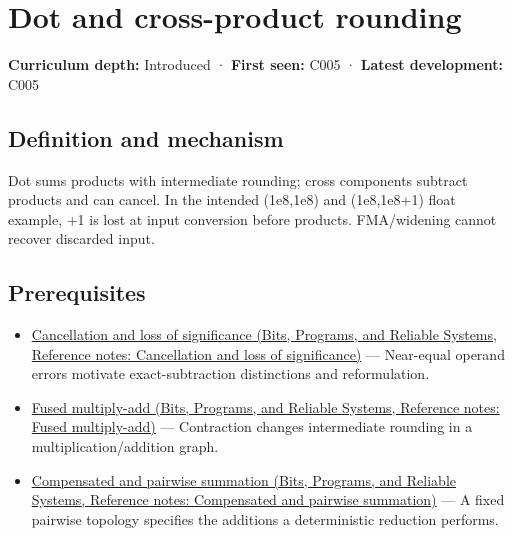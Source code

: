\hypertarget{appendix-5aef4f13483a}{}\label{referencestart:appendix-5aef4f13483a}
\section{Dot and cross-product rounding}\label{appendix-5aef4f13483a-dot-and-cross-product-rounding}

\hypertarget{appendix-5aef4f13483a-dot-and-cross-product-rounding}{}

\textbf{Curriculum depth:} Introduced · \textbf{First seen:} C005 · \textbf{Latest development:} C005

\begin{allmightroledefinition}

\subsection{Definition and mechanism}\label{appendix-5aef4f13483a-definition-and-mechanism}

\hypertarget{appendix-5aef4f13483a-definition-and-mechanism}{}

Dot sums products with intermediate rounding; cross components subtract products and can cancel. In the intended (1e8,1e8) and (1e8,1e8+1) float example, +1 is lost at input conversion before products. FMA/widening cannot recover discarded input.

\end{allmightroledefinition}

\subsection{Prerequisites}\label{appendix-5aef4f13483a-prerequisites}

\hypertarget{appendix-5aef4f13483a-prerequisites}{}

\begin{itemize}
\tightlist
\item
  \href{../01-Bits-Programs-and-Reliable-Systems/main.pdf\#nameddest=appendix-a2773a6a2f9d}{Cancellation and loss of significance (Bits, Programs, and Reliable Systems, Reference notes: Cancellation and loss of significance)} --- Near-equal operand errors motivate exact-subtraction distinctions and reformulation.
\item
  \href{../01-Bits-Programs-and-Reliable-Systems/main.pdf\#nameddest=appendix-41e8ef22a21e}{Fused multiply-add (Bits, Programs, and Reliable Systems, Reference notes: Fused multiply-add)} --- Contraction changes intermediate rounding in a multiplication/addition graph.
\item
  \href{../01-Bits-Programs-and-Reliable-Systems/main.pdf\#nameddest=appendix-df318da57389}{Compensated and pairwise summation (Bits, Programs, and Reliable Systems, Reference notes: Compensated and pairwise summation)} --- A fixed pairwise topology specifies the additions a deterministic reduction performs.
\end{itemize}

